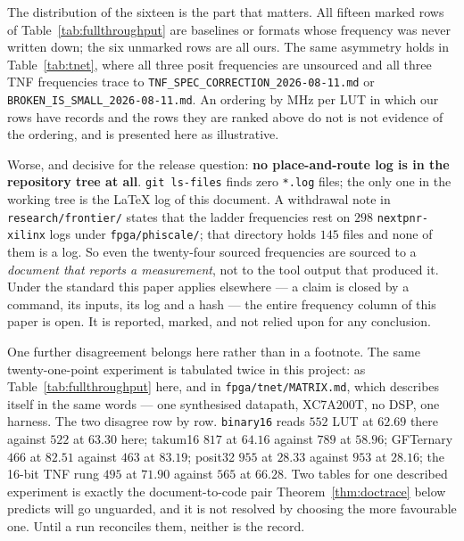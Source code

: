 \documentclass[11pt]{article}
\theoremstyle{definition}
\begin{document}
The distribution of the sixteen is the part that matters. All fifteen marked rows
of Table~\ref{tab:fullthroughput} are baselines or formats whose frequency was
never written down; the six unmarked rows are all ours. The same asymmetry holds in
Table~\ref{tab:tnet}, where all three posit frequencies are unsourced and all three
TNF frequencies trace to
\texttt{TNF\_SPEC\_CORRECTION\_2026-08-11.md} or
\texttt{BROKEN\_IS\_SMALL\_2026-08-11.md}. An ordering by MHz per LUT in which our
rows have records and the rows they are ranked above do not is not evidence of the
ordering, and is presented here as illustrative.

Worse, and decisive for the release question: \textbf{no place-and-route log is in
the repository tree at all}. \texttt{git ls-files} finds zero \texttt{*.log} files;
the only one in the working tree is the \LaTeX{} log of this document. A
withdrawal note in \texttt{research/frontier/} states that the ladder frequencies
rest on $298$ \texttt{nextpnr-xilinx} logs under \texttt{fpga/phiscale/}; that
directory holds $145$ files and none of them is a log. So even the twenty-four
sourced frequencies are sourced to a \emph{document that reports a measurement},
not to the tool output that produced it. Under the standard this paper applies
elsewhere --- a claim is closed by a command, its inputs, its log and a hash --- the
entire frequency column of this paper is open. It is reported, marked, and not
relied upon for any conclusion.

One further disagreement belongs here rather than in a footnote. The same
twenty-one-point experiment is tabulated twice in this project: as
Table~\ref{tab:fullthroughput} here, and in \texttt{fpga/tnet/MATRIX.md}, which
describes itself in the same words --- one synthesised datapath, XC7A200T, no DSP,
one harness. The two disagree row by row. \texttt{binary16} reads $552$ LUT at
$62.69$ there against $522$ at $63.30$ here; takum16 $817$ at $64.16$ against $789$
at $58.96$; GFTernary $466$ at $82.51$ against $463$ at $83.19$; posit32 $955$ at
$28.33$ against $953$ at $28.16$; the 16-bit TNF rung $495$ at $71.90$ against $565$
at $66.28$. Two tables for one described experiment is exactly the document-to-code
pair Theorem~\ref{thm:doctrace} below predicts will go unguarded, and it is not
resolved by choosing the more favourable one. Until a run reconciles them, neither
is the record.
\end{document}
